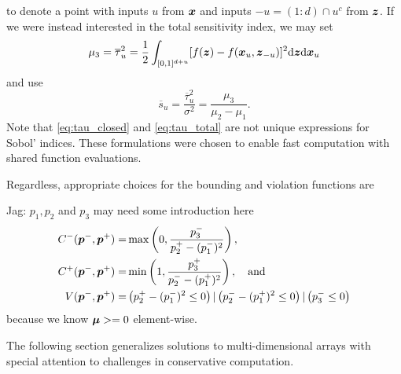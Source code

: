 \documentclass{article}[12pt]
\newcommand{\JRComment}[1]{{\color{violet} Jag: #1}}
\begin{document}
\begin{itemize}
\begin{equation}
    \end{equation}
    to denote a point with inputs $u$ from $\boldsymbol{x}$ and inputs $-u=(1:d)\cap u^c$ from $\boldsymbol{z}$. If we were instead interested in the total sensitivity index, we may set 
    \begin{equation}
        \mu_3 = \overline{\tau}_u^2 = \frac{1}{2}\int_{[0,1]^{d+u}} [f(\boldsymbol{z})-f(\boldsymbol{x}_u,\boldsymbol{z}_{-u})]^2\mathrm{d}\boldsymbol{z}\mathrm{d}\boldsymbol{x}_u
    \label{eq:tau_total}
    \end{equation}
    and use 
    \begin{equation*}
        \overline{s}_u = \frac{\overline{\tau}_u^2}{\sigma^2} = \frac{\mu_3}{\mu_2-\mu_1}.
    \end{equation*}
    Note that \eqref{eq:tau_closed} and \eqref{eq:tau_total} are not unique expressions for Sobol' indices. These formulations were chosen to enable fast computation with shared function evaluations. 
    
    Regardless, appropriate choices for the bounding and violation functions are 
    
    \JRComment{$p_1, p_2$ and $p_3$ may need some introduction here}
    \begin{align*}
        C^-(\boldsymbol{p}^-,\boldsymbol{p}^+) =& \max\left(0, \frac{p_3^-}{p_2^+ - (p_1^-)^2} \right), \\
        C^+(\boldsymbol{p}^-,\boldsymbol{p}^+) =& \min\left(1, \frac{p_3^+}{p_2^- - (p_1^+)^2}\right), \quad \text{and} \\
        V(\boldsymbol{p}^-,\boldsymbol{p}^+) =& \left(p_2^+-(p_1^-)^2 \leq 0\right) | \left(p_2^--(p_1^+)^2 \leq 0\right) | \left(p_3^- \leq 0\right)
    \end{align*}
    because we know $\boldsymbol{\mu}>=0$ element-wise. 
    
\end{itemize}
The following section generalizes solutions to multi-dimensional arrays with special attention to challenges in conservative computation. 
\end{document}
